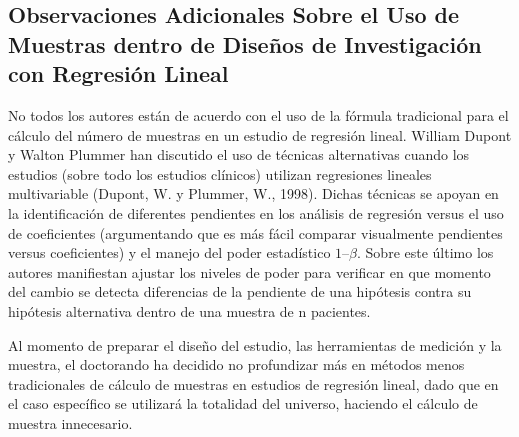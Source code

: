 \begin{spacing}{1.5}
\subsection{Observaciones Adicionales Sobre el Uso de Muestras dentro de Diseños de Investigación con Regresión Lineal}
No todos los autores están de acuerdo con el uso de la fórmula tradicional para el cálculo del número de muestras en un estudio de regresión lineal. William Dupont y Walton Plummer han discutido el uso de técnicas alternativas cuando los estudios (sobre todo los estudios clínicos) utilizan regresiones lineales multivariable (Dupont, W. y Plummer, W., 1998). Dichas técnicas se apoyan en la identificación de diferentes pendientes en los análisis de regresión versus el uso de coeficientes (argumentando que es más fácil comparar visualmente pendientes versus coeficientes) y el manejo del poder estadístico $1 – \beta$. Sobre este último los autores manifiestan ajustar los niveles de poder para verificar en que momento del cambio se detecta diferencias de la pendiente de una hipótesis contra su hipótesis alternativa dentro de una muestra de n pacientes. 

Al momento de preparar el diseño del estudio, las herramientas de medición y la muestra, el doctorando ha decidido no profundizar más en métodos menos tradicionales de cálculo de muestras en estudios de regresión lineal, dado que en el caso específico se utilizará la totalidad del universo, haciendo el cálculo de muestra innecesario. 
\end{spacing}
